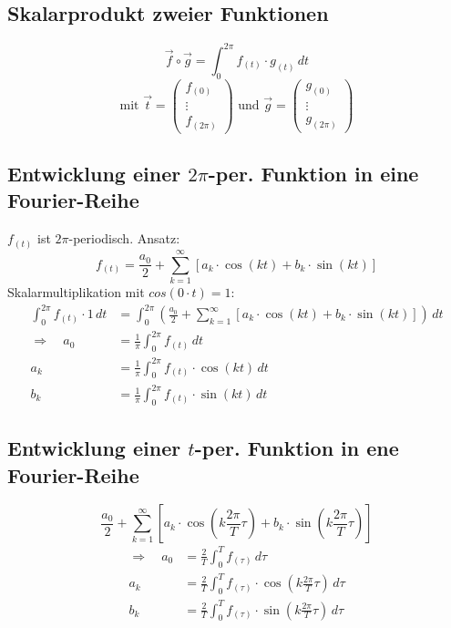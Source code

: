\subsection{Skalarprodukt zweier Funktionen}
\begin{equation}
	\Vec{f}\circ\Vec{g}=\int_0^{2\pi} f_{(t)}\cdot g_{(t)}\,dt
\end{equation}
\begin{equation*}
	\text{mit } \Vec{t}=\begin{pmatrix}f_{(0)}\\ \vdots \\ f_{(2\pi)}\end{pmatrix}
	\text{ und } \Vec{g}=\begin{pmatrix}g_{(0)} \\ \vdots \\ g_{(2\pi)} \end{pmatrix}
\end{equation*}

\subsection{Entwicklung einer $2\pi$-per. Funktion in eine Fourier-Reihe}
$f_{(t)}$ ist $2\pi$-periodisch. Ansatz:
\begin{equation*}
	f_{(t)}=\frac{a_0}{2}+\sum_{k=1}^\infty{\left[a_k\cdot\cos(kt)+b_k\cdot\sin(kt)\right]}
\end{equation*}
Skalarmultiplikation mit $cos(0\cdot t)=1$:
\begin{align*}
	\int_0^{2\pi} f_{(t)}\cdot 1\,dt
		&= \int_0^{2\pi}{\left({\frac{a_0}{2}+\sum_{k=1}^\infty\left[a_k\cdot\cos(kt)+b_k\cdot\sin(kt)\right]}\right)}\,dt \\
	\Longrightarrow\quad a_0 &= \frac{1}{\pi}\int_0^{2\pi} f_{(t)}\,dt \\
	a_k &= \frac{1}{\pi}\int_0^{2\pi} f_{(t)}\cdot\cos(kt)\,dt \\
	b_k &= \frac{1}{\pi}\int_0^{2\pi} f_{(t)}\cdot\sin(kt)\,dt
\end{align*}

\subsection{Entwicklung einer $t$-per. Funktion in ene Fourier-Reihe}
\begin{equation}
	\frac{a_0}{2}+\sum_{k=1}^\infty{\left[{a_k\cdot\cos\left({k\frac{2\pi}{T}\tau}\right)
		+b_k\cdot\sin\left(k\frac{2\pi}{T}\tau\right)}\right]}
\end{equation}
\begin{align*}
	\Longrightarrow\quad a_0 &= \frac{2}{T}\int_0^T f_{(\tau)}\,d\tau \\
	a_k &= \frac{2}{T}\int_0^T f_{(\tau)}\cdot\cos\left({k\frac{2\pi}{T}\tau}\right)\,d\tau \\
	b_k &= \frac{2}{T}\int_0^T f_{(\tau)}\cdot\sin\left({k\frac{2\pi}{T}\tau}\right)\,d\tau
\end{align*}

